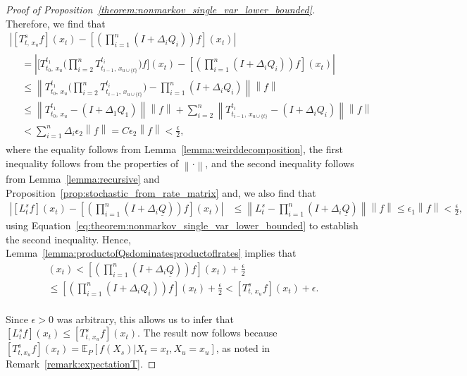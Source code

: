 \documentclass[10pt,a4paper]{paper}
\theoremstyle{definition}
\newcommand{\lrate}{\underline{Q}}
\newcommand{\norm}[1]{\left\lVert #1 \right\rVert}
\newcommand{\abs}[1]{\left\vert #1 \right\vert}
\begin{document}
\begin{proof}[Proof of Proposition~\ref{theorem:nonmarkov_single_var_lower_bounded}]
Therefore, we find that
\begin{multline*}
\abs{[T_{t,\,x_u}^sf](x_t)
-\left[\left(\prod_{i=1}^n(I+\Delta_iQ_i)\right)f\right](x_t)}\\
\begin{aligned}
&=\abs{\Big[T_{t_0,\,x_u}^{t_1}\Bigg(\prod_{i=2}^{n}T_{t_{i-1},\,x_{u\cup\{t\}}}^{t_{i}}\Bigg)f\Big](x_t)
-\left[\left(\prod_{i=1}^n(I+\Delta_iQ_i)\right)f\right](x_t)}\\
&\leq\norm{T_{t_0,\,x_u}^{t_1}\Bigg(\prod_{i=2}^{n}T_{t_{i-1},\,x_{u\cup\{t\}}}^{t_{i}}\Bigg)
-\prod_{i=1}^n(I+\Delta_iQ_i)}\norm{f}\\
&\leq
\norm{T_{t_0,\,x_u}^{t_1}-(I+\Delta_1Q_1)}\norm{f}
+\sum_{i=2}^{n}
\norm{T_{t_{i-1},\,x_{u\cup\{t\}}}^{t_{i}}-(I+\Delta_iQ_i)}\norm{f}\\
&<\sum_{i=1}^n\Delta_i\epsilon_2\norm{f}=C\epsilon_2\norm{f}<\frac{\epsilon}{2},
\end{aligned}
\end{multline*}
where the equality follows from Lemma~\ref{lemma:weirddecomposition}, the first inequality follows from the properties of $\norm{\cdot}$, and the second inequality follows from Lemma~\ref{lemma:recursive} and Proposition~\ref{prop:stochastic_from_rate_matrix} and, we also find that
\begin{align*}
\abs{[L_t^sf](x_t)-\left[\left(\prod_{i=1}^n(I+\Delta_i\lrate)\right)f\right](x_t)}
&\leq
\norm{L_t^s-\prod_{i=1}^n(I+\Delta_i\lrate)}\norm{f}\leq\epsilon_1\norm{f}<\frac{\epsilon}{2},
\end{align*}
using Equation~\eqref{eq:theorem:nonmarkov_single_var_lower_bounded} to establish the second inequality. Hence, Lemma~\ref{lemma:productofQsdominatesproductoflrates} implies that
\begin{multline*}
[L_{t}^s f](x_t)
<\left[\left(\prod_{i=1}^n(I+\Delta_i\lrate)\right)f\right](x_t)+\frac{\epsilon}{2}\\
\leq
\left[\left(\prod_{i=1}^n(I+\Delta_i Q_i)\right)f\right](x_t)+\frac{\epsilon}{2}
<[T_{t,\,x_u}^sf](x_t)+\epsilon.
\end{multline*}\\[-0pt]
Since $\epsilon>0$ was arbitrary, this allows us to infer that $[L_{t}^s f](x_t)\leq [T_{t,\,x_u}^sf](x_t)$. The result now follows because $[T_{t,x_u}^sf](x_t)=\mathbb{E}_P[f(X_s)\vert X_t=x_t,X_u=x_u]$, as noted in Remark~\ref{remark:expectationT}.

\end{proof}
\end{document}
